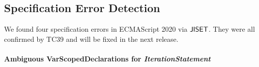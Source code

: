 
\subsection{Specification Error Detection}

We found four specification errors in ECMAScript 2020 via \( \text{\sf JISET} \).
They were all confirmed by TC39 and will be fixed in the next release.

\paragraph{Ambiguous \textbf{VarScopedDeclarations} for \textit{IterationStatement}}




